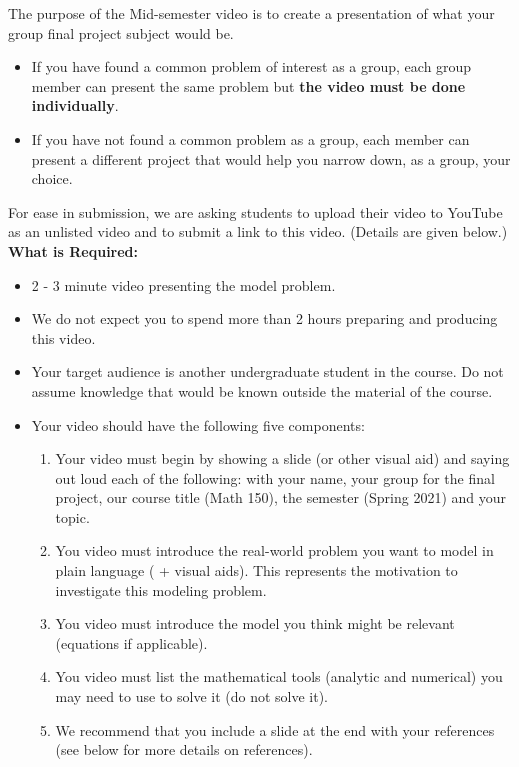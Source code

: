 \documentclass[11pt]{article}
\begin{document}
The purpose of the Mid-semester video is to create a presentation of what your group final project subject would be. 
\begin{itemize}
\item If you have found a common problem of interest as a group, each group member can present the same problem but \textbf{the video must be done individually}.
\item If you have not found a common problem as a group, each member can present a different project that would help you narrow down, as a group, your choice.
\end{itemize}
For ease in submission, we are asking students to upload their video to YouTube as an unlisted video and to submit a link to this video. (Details are given below.)\\
 \textbf{What is Required:}
\begin{itemize}
\item 2 - 3 minute video presenting the model problem.
\item We do not expect you to spend more than 2 hours preparing and producing this video. 
\item Your target audience is another undergraduate student in the course. Do not assume knowledge that would be known outside the material of the course.
\item Your video should have the following five components: 
\begin{enumerate}
\item Your video must begin by showing a slide (or other visual aid) and saying out loud each of the following: with your name, your group for the final project, our course title (Math 150), the semester (Spring 2021) and your topic.
\item You video must introduce the real-world problem you want to model in plain language ( + visual aids). This represents the motivation to investigate this modeling problem.
\item You video must introduce the model you think might be relevant (equations if applicable). 
\item You video must list the mathematical tools (analytic and numerical) you may need to use to solve it (do not solve it).
\item We recommend that you include a slide at the end with your references (see below for more details on references).

\end{enumerate}
\end{itemize}
\end{document}

